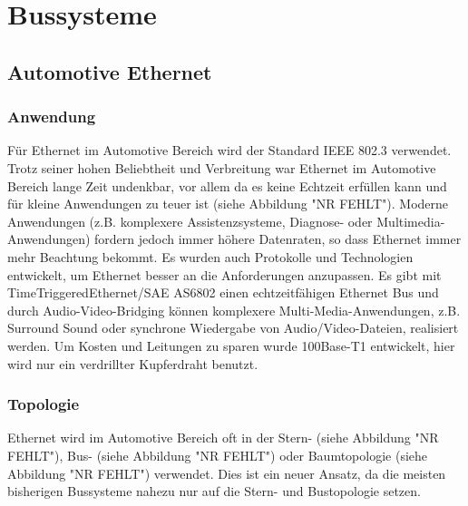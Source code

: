 \graphicspath{{./Images/Kapitel4/}}

\section{Bussysteme}

\subsection{Automotive Ethernet}
\subsubsection{Anwendung}
Für Ethernet im Automotive Bereich wird der Standard IEEE 802.3 verwendet. Trotz seiner hohen Beliebtheit und Verbreitung war Ethernet im Automotive Bereich lange Zeit undenkbar, vor allem da es keine Echtzeit erfüllen kann und für kleine Anwendungen zu teuer ist (siehe Abbildung "NR FEHLT"). Moderne Anwendungen (z.B. komplexere Assistenzsysteme, Diagnose- oder Multimedia-Anwendungen) fordern jedoch immer höhere Datenraten, so dass Ethernet immer mehr Beachtung bekommt. Es wurden auch Protokolle und Technologien entwickelt, um Ethernet besser an die Anforderungen anzupassen. Es gibt mit TimeTriggeredEthernet/SAE AS6802 einen echtzeitfähigen Ethernet Bus und durch Audio-Video-Bridging können komplexere Multi-Media-Anwendungen, z.B. Surround Sound oder synchrone Wiedergabe von Audio/Video-Dateien, realisiert werden. Um Kosten und Leitungen zu sparen wurde 100Base-T1 entwickelt, hier wird nur ein verdrillter Kupferdraht benutzt. \cite{.MH_Ethernet}

\subsubsection{Topologie}
Ethernet wird im Automotive Bereich oft in der Stern- (siehe Abbildung "NR FEHLT"), Bus- (siehe Abbildung "NR FEHLT") oder Baumtopologie (siehe Abbildung "NR FEHLT") verwendet. Dies ist ein neuer Ansatz, da die meisten bisherigen Bussysteme nahezu nur auf die Stern- und Bustopologie setzen.

\cite{.MH_Vehicle}

